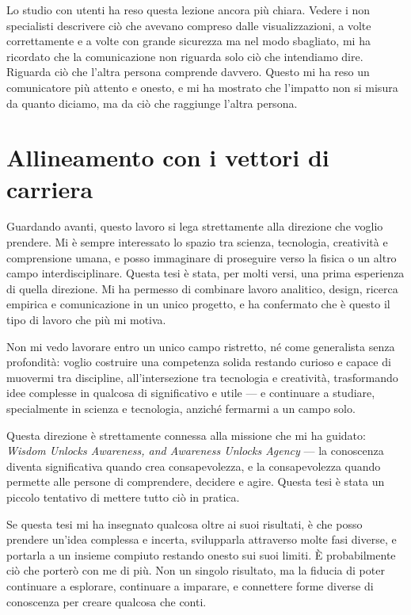 Lo studio con utenti ha reso questa lezione ancora più chiara. Vedere i non specialisti descrivere ciò che avevano compreso dalle visualizzazioni, a volte correttamente e a volte con grande sicurezza ma nel modo sbagliato, mi ha ricordato che la comunicazione non riguarda solo ciò che intendiamo dire. Riguarda ciò che l'altra persona comprende davvero. Questo mi ha reso un comunicatore più attento e onesto, e mi ha mostrato che l'impatto non si misura da quanto diciamo, ma da ciò che raggiunge l'altra persona.

\section{Allineamento con i vettori di carriera}
\label{sec:alignment}

Guardando avanti, questo lavoro si lega strettamente alla direzione che voglio prendere. Mi è sempre interessato lo spazio tra scienza, tecnologia, creatività e comprensione umana, e posso immaginare di proseguire verso la fisica o un altro campo interdisciplinare. Questa tesi è stata, per molti versi, una prima esperienza di quella direzione. Mi ha permesso di combinare lavoro analitico, design, ricerca empirica e comunicazione in un unico progetto, e ha confermato che è questo il tipo di lavoro che più mi motiva.

Non mi vedo lavorare entro un unico campo ristretto, né come generalista senza profondità: voglio costruire una competenza solida restando curioso e capace di muovermi tra discipline, all'intersezione tra tecnologia e creatività, trasformando idee complesse in qualcosa di significativo e utile --- e continuare a studiare, specialmente in scienza e tecnologia, anziché fermarmi a un campo solo.

Questa direzione è strettamente connessa alla missione che mi ha guidato: \emph{Wisdom Unlocks Awareness, and Awareness Unlocks Agency} --- la conoscenza diventa significativa quando crea consapevolezza, e la consapevolezza quando permette alle persone di comprendere, decidere e agire. Questa tesi è stata un piccolo tentativo di mettere tutto ciò in pratica.

Se questa tesi mi ha insegnato qualcosa oltre ai suoi risultati, è che posso prendere un'idea complessa e incerta, svilupparla attraverso molte fasi diverse, e portarla a un insieme compiuto restando onesto sui suoi limiti. È probabilmente ciò che porterò con me di più. Non un singolo risultato, ma la fiducia di poter continuare a esplorare, continuare a imparare, e connettere forme diverse di conoscenza per creare qualcosa che conti.

